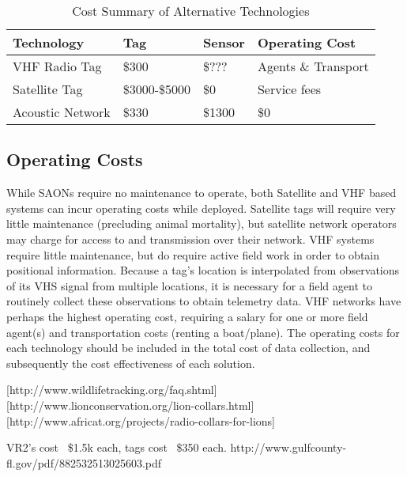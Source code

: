 \begin{table}[h!]
		\caption{Cost Summary of Alternative Technologies}
		\label{tab:table1}
		\begin{tabular}{l l l l}
Technology&Tag&Sensor&Operating Cost\\
\hline
			VHF Radio Tag		 & \$300          & \$???  & Agents \& Transport\\
			Satellite Tag 	     & \$3000-\$5000\cite{wildlifetracking}  & \$0    & Service fees\\
			Acoustic Network 	 & \$330          & \$1300 & \$0\\
		\end{tabular}
		\begin{center}
			
		\end{center}
\end{table}

\subsection{Operating Costs}
While SAONs require no maintenance to operate, both Satellite and VHF based systems can incur operating costs while deployed.  Satellite tags will require very little maintenance (precluding animal mortality), but satellite network operators may charge for access to and transmission over their network\cite{wildlifetracking}.  VHF systems require little maintenance, but do require active field work in order to obtain positional information.  Because a tag's location is interpolated from observations of its VHS signal from multiple locations, it is necessary for a field agent to routinely collect these observations to obtain telemetry data.  VHF networks have perhaps the highest operating cost, requiring a salary for one or more field agent(s) and transportation costs (renting a boat/plane).  The operating costs for each technology should be included in the total cost of data collection, and subsequently the cost effectiveness of each solution.
  
  
[http://www.wildlifetracking.org/faq.shtml]
[http://www.lionconservation.org/lion-collars.html]
[http://www.africat.org/projects/radio-collars-for-lions]

VR2's cost ~\$1.5k each, tags cost ~\$350 each.  http://www.gulfcounty-fl.gov/pdf/882532513025603.pdf 

